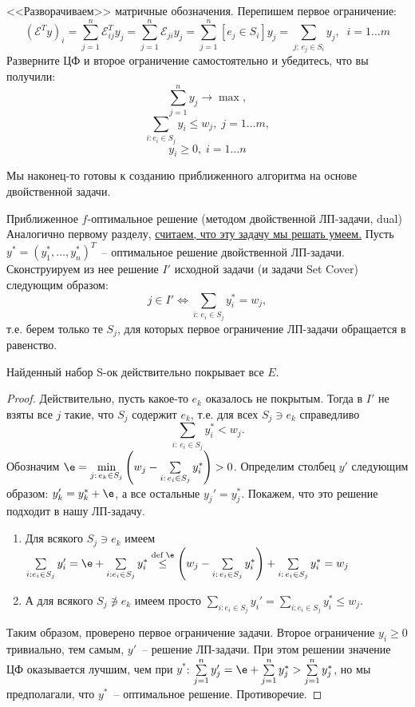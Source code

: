 <<Разворачиваем>> матричные обозначения. Перепишем первое ограничение:
$$(\mathcal{E}^Ty)_i = \sum_{j=1}^n\mathcal{E}^T_{ij}y_j = \sum_{j=1}^n\mathcal{E}_{ji}y_j = \sum_{j=1}^n [e_j \in S_i] y_j = \sum_{j:\, e_j \in S_i} y_j, \;\; i=1\ldots m$$
Разверните ЦФ и второе ограничение самостоятельно и убедитесь, что вы получили:
$$\sum_{j=1}^n y_j \rightarrow\max,$$
$$\sum_{i: e_i \in S_j} y_i\leq w_j, \; j=1\ldots m,$$
$$y_i \geq 0, \; i=1\ldots n$$

Мы наконец-то готовы к созданию приближенного алгоритма на основе двойственной задачи.

\begin{algodescription}{Приближенное $f$-оптимальное решение (методом двойственной ЛП-задачи, dual)}
    Аналогично первому разделу, \underline{считаем, что эту задачу мы решать умеем.} Пусть $y^* = (y_1^*, \ldots, y_n^*)^T$~-- оптимальное решение двойственной ЛП-задачи. Сконструируем из нее решение $I'$ исходной задачи (и задачи Set Cover) следующим образом:
    $$j \in I' \iff \sum_{i:\, e_i \in S_j}y_i^* = w_j,$$
    т.е. берем только те $S_j$, для которых первое ограничение ЛП-задачи обращается в равенство.
\end{algodescription}

\begin{theorem*}
    Найденный набор S-ок действительно покрывает все $E$.
\end{theorem*}
\begin{proof}
    Действительно, пусть какое-то $e_k$ оказалось не покрытым. Тогда в $I'$ не взяты все $j$ такие, что $S_j$ содержит $e_k$, т.е. для всех $S_j \ni e_k$ справедливо $$\sum_{i:\, e_i \in S_j}y_i^* < w_j.$$
    Обозначим $\e = \min\limits_{j:\, e_k \in S_j} \left(w_j - \sum\limits_{i:\, e_i \in S_j}y_i^*\right) > 0$. Определим столбец $y'$ следующим образом: $y_k' = y_k^* + \e$, а все остальные $y_j' = y_j^*$. Покажем, что это решение подходит в нашу ЛП-задачу.
    \begin{enumerate}
        \item Для всякого $S_j \ni e_k$ имеем $\sum\limits_{i: e_i \in S_j} y_i' = \e + \sum\limits_{i: e_i \in S_j} y_i^* \overset{\text{def }\e}{\leq} \left(w_j - \sum\limits_{i:\, e_i \in S_j}y_i^*\right) + \sum\limits_{i:\, e_i \in S_j}y_i^* = w_j$

        \item А для всякого $S_j \not\ni e_k$ имеем просто $\sum\limits_{i: e_i \in S_j} y_i' = \sum\limits_{i: e_i \in S_j} y_i^* \leq w_j$.
    \end{enumerate}

    Таким образом, проверено первое ограничение задачи. Второе ограничение $y_i \geq 0$ тривиально, тем самым, $y'$~-- решение ЛП-задачи. При этом решении значение ЦФ оказывается лучшим, чем при $y^*$: $\sum\limits_{j=1}^ny_j' = \e + \sum\limits_{j=1}^n y_j^* > \sum\limits_{j=1}^n y_j^*$, но мы предполагали, что $y^*$~-- оптимальное решение. Противоречие.
\end{proof}

